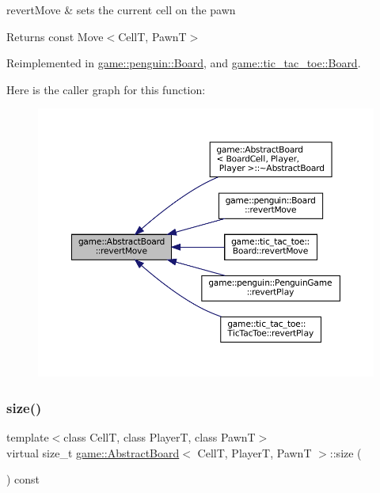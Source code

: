 revert\+Move \& sets the current cell on the pawn 

\begin{DoxyReturn}{Returns}
const Move$<$\+Cell\+T, Pawn\+T$>$ 
\end{DoxyReturn}


Reimplemented in \hyperlink{classgame_1_1penguin_1_1_board_a45ecb5bba50b4d03592ac4ddf9255b49}{game\+::penguin\+::\+Board}, and \hyperlink{classgame_1_1tic__tac__toe_1_1_board_ac77aad0bb0945d12a959bb8db0e31908}{game\+::tic\+\_\+tac\+\_\+toe\+::\+Board}.

Here is the caller graph for this function\+:
\nopagebreak
\begin{figure}[H]
\begin{center}
\leavevmode
\includegraphics[width=350pt]{classgame_1_1_abstract_board_acc2d5fac68ec019e42fe166b727b7299_icgraph}
\end{center}
\end{figure}
\mbox{\label{classgame_1_1_abstract_board_a17bd6905ded76d0005437d288fe8ac21}} 
\subsubsection{\texorpdfstring{size()}{size()}}
{\footnotesize\ttfamily template$<$class CellT, class PlayerT, class PawnT$>$ \\
virtual size\+\_\+t \hyperlink{classgame_1_1_abstract_board}{game\+::\+Abstract\+Board}$<$ CellT, PlayerT, PawnT $>$\+::size (\begin{DoxyParamCaption}{ }\end{DoxyParamCaption}) const\hspace{0.3cm}{\ttfamily [pure virtual]}}



